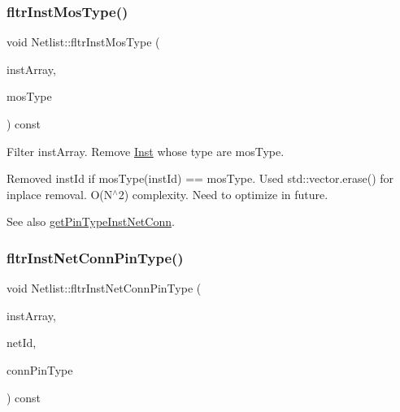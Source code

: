 \subsubsection{\texorpdfstring{fltr\+Inst\+Mos\+Type()}{fltrInstMosType()}}
{\footnotesize\ttfamily void Netlist\+::fltr\+Inst\+Mos\+Type (\begin{DoxyParamCaption}\item[{std\+::vector$<$ \hyperlink{type_8h_a581e8093e28e7362f2b6937296190676}{Index\+Type} $>$ \&}]{inst\+Array,  }\item[{\hyperlink{type_8h_a34a6a66323cfecf83dfe00bc8fd96333}{Mos\+Type}}]{mos\+Type }\end{DoxyParamCaption}) const}



Filter inst\+Array. Remove \hyperlink{classInst}{Inst} whose type are mos\+Type. 

Removed inst\+Id if mos\+Type(inst\+Id) == mos\+Type. Used std\+::vector.\+erase() for inplace removal. O(\+N$^\wedge$2) complexity. Need to optimize in future.

\begin{DoxySeeAlso}{See also}
\hyperlink{classNetlist_a6bc6f9666ed8c833b967c38f2e164a1e}{get\+Pin\+Type\+Inst\+Net\+Conn}. 
\end{DoxySeeAlso}
\mbox{\label{classNetlist_a525b81a4d2bba3c381c9d76be91acba8}} 
\subsubsection{\texorpdfstring{fltr\+Inst\+Net\+Conn\+Pin\+Type()}{fltrInstNetConnPinType()}}
{\footnotesize\ttfamily void Netlist\+::fltr\+Inst\+Net\+Conn\+Pin\+Type (\begin{DoxyParamCaption}\item[{std\+::vector$<$ \hyperlink{type_8h_a581e8093e28e7362f2b6937296190676}{Index\+Type} $>$ \&}]{inst\+Array,  }\item[{\hyperlink{type_8h_a581e8093e28e7362f2b6937296190676}{Index\+Type}}]{net\+Id,  }\item[{\hyperlink{type_8h_afaab50027002ecbb6c8ac27e727d1bb4}{Pin\+Type}}]{conn\+Pin\+Type }\end{DoxyParamCaption}) const}



